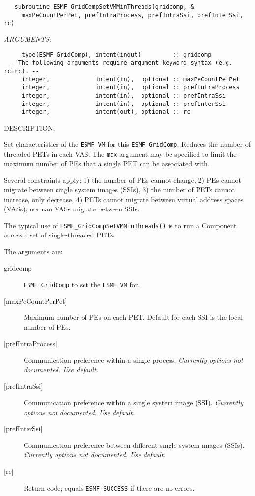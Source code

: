   
\begin{verbatim}   subroutine ESMF_GridCompSetVMMinThreads(gridcomp, &
     maxPeCountPerPet, prefIntraProcess, prefIntraSsi, prefInterSsi, rc)\end{verbatim}{\em ARGUMENTS:}
\begin{verbatim}     type(ESMF_GridComp), intent(inout)         :: gridcomp
 -- The following arguments require argument keyword syntax (e.g. rc=rc). --
     integer,             intent(in),  optional :: maxPeCountPerPet
     integer,             intent(in),  optional :: prefIntraProcess
     integer,             intent(in),  optional :: prefIntraSsi
     integer,             intent(in),  optional :: prefInterSsi
     integer,             intent(out), optional :: rc\end{verbatim}
{\sf DESCRIPTION:\\ }


     Set characteristics of the {\tt ESMF\_VM} for this {\tt ESMF\_GridComp}.
     Reduces the number of threaded PETs in each VAS. The {\tt max} argument
     may be specified to limit the maximum number of PEs that a single PET
     can be associated with.
  
     Several constraints apply: 1) the number of PEs cannot change, 2) PEs
     cannot migrate between single system images (SSIs), 3) the number of PETs
     cannot increase, only decrease, 4) PETs cannot migrate between virtual
     address spaces (VASs), nor can VASs migrate between SSIs.
  
     The typical use of {\tt ESMF\_GridCompSetVMMinThreads()} is to run a
     Component across a set of single-threaded PETs.
  
   The arguments are:
   \begin{description}
   \item[gridcomp]
     {\tt ESMF\_GridComp} to set the {\tt ESMF\_VM} for.
   \item[{[maxPeCountPerPet]}]
     Maximum number of PEs on each PET.
     Default for each SSI is the local number of PEs.
   \item[{[prefIntraProcess]}]
     Communication preference within a single process.
     {\em Currently options not documented. Use default.}
   \item[{[prefIntraSsi]}]
     Communication preference within a single system image (SSI).
     {\em Currently options not documented. Use default.}
   \item[{[prefInterSsi]}]
     Communication preference between different single system images (SSIs).
     {\em Currently options not documented. Use default.}
   \item[{[rc]}]
     Return code; equals {\tt ESMF\_SUCCESS} if there are no errors.
   \end{description}
   
